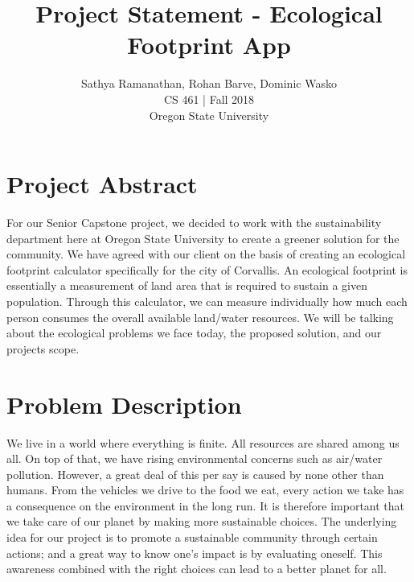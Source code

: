 \documentclass[10pt,draftclsnofoot,onecolumn,journal,compsoc]{IEEEtran}
\begin{document}
\title{Project Statement - Ecological Footprint App}
\author{Sathya Ramanathan, Rohan Barve, Dominic Wasko \\
CS 461 | Fall 2018 \\
Oregon State University \\
}

\begin{titlepage}

    \centering
    \maketitle

\end{titlepage}

\clearpage


\section{Project Abstract}

For our Senior Capstone project, we decided to work with the sustainability department here at Oregon State University to create a greener solution for the community. We have agreed with our client on the basis of creating an ecological footprint calculator specifically for the city of Corvallis. An ecological footprint is essentially a measurement of land area that is required to sustain a given population. Through this calculator, we can measure individually how much each person consumes the overall available land/water resources. We will be talking about the ecological problems we face today, the proposed solution, and our projects scope.


\section{Problem Description}

We live in a world where everything is finite. All resources are shared among us all. On top of that, we have rising environmental concerns such as air/water pollution. However, a great deal of this per say is caused by none other than humans. From the vehicles we drive to the food we eat, every action we take has a consequence on the environment in the long run. It is therefore important that we take care of our planet by making more sustainable choices. The underlying idea for our project is to promote a sustainable community through certain actions; and a great way to know one’s impact is by evaluating oneself. This awareness combined with the right choices can lead to a better planet for all.
\end{document}
